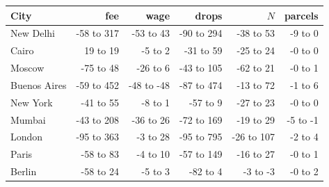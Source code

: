 \begin{tabular}{lrrrrr}
\toprule
City & fee & wage & drops & $N$ & parcels \\
\midrule
New Delhi & -58 to 317 & -53 to 43 & -90 to 294 & -38 to 53 & -9 to 0 \\
Cairo & 19 to 19 & -5 to 2 & -31 to 59 & -25 to 24 & -0 to 0 \\
Moscow & -75 to 48 & -26 to 6 & -43 to 105 & -62 to 21 & -0 to 1 \\
Buenos Aires & -59 to 452 & -48 to -48 & -87 to 474 & -13 to 72 & -1 to 6 \\
New York & -41 to 55 & -8 to 1 & -57 to 9 & -27 to 23 & -0 to 0 \\
Mumbai & -43 to 208 & -36 to 26 & -72 to 169 & -19 to 29 & -5 to -1 \\
London & -95 to 363 & -3 to 28 & -95 to 795 & -26 to 107 & -2 to 4 \\
Paris & -58 to 83 & -4 to 10 & -57 to 149 & -16 to 27 & -0 to 1 \\
Berlin & -58 to 24 & -5 to 3 & -82 to 4 & -3 to -3 & -0 to 2 \\
\bottomrule
\end{tabular}
